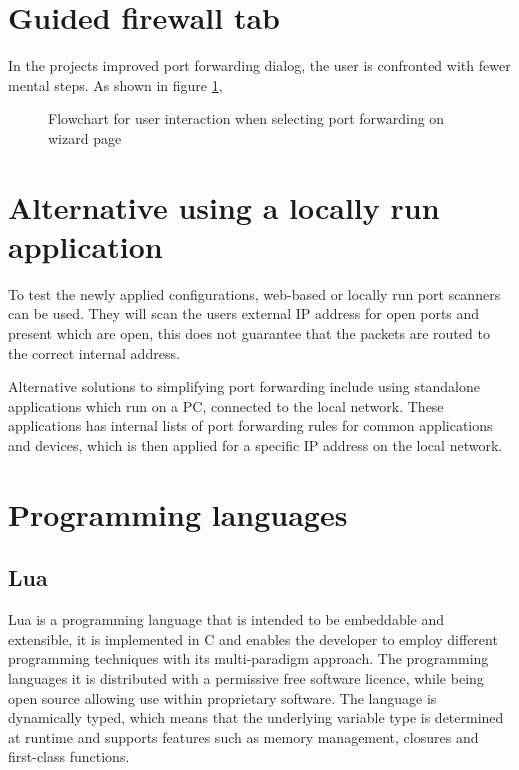 \documentclass[a4paper,11pt,makeidx]{kth-bcs}
\begin{document}
\section{Guided firewall tab}
In the projects improved port forwarding dialog, the user is confronted with fewer mental steps.
As shown in figure \ref{fig:after}, 
\begin{figure}[h]
   \centering
   \caption{Flowchart for user interaction when selecting port forwarding on wizard page}
   \label{fig:after}
\end{figure}

\section{Alternative using a locally run application}
To test the newly applied configurations, web-based or locally run port scanners can be used.
They will scan the users external IP address for open ports and present which are open, this does not guarantee that the packets are routed to the correct internal address.

Alternative solutions to simplifying port forwarding include using standalone applications which run on a PC, connected to the local network.
These applications has internal lists of port forwarding rules for common applications and devices, which is then applied for a specific IP address on the local network.\cite{portforward.com}

\section{Programming languages}
\subsection{Lua}
Lua is a programming language that is intended to be embeddable and extensible, it is implemented in C and enables the developer to employ different programming techniques with its multi-paradigm approach.
The programming languages it is distributed with a permissive free software licence\cite{mit-license}, while being open source allowing use within proprietary software.
The language is dynamically typed, which means that the underlying variable type is determined at runtime and supports features such as memory management, closures and first-class functions.\nocite{ierusalimschy2006programming}
\end{document}
